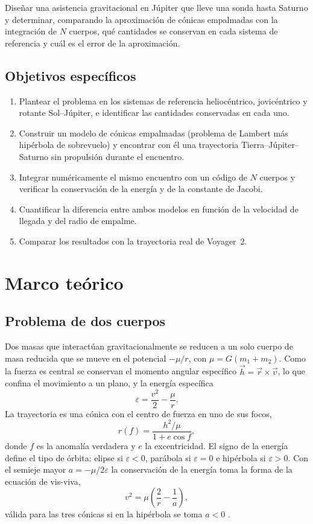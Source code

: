 \documentclass[12pt,letterpaper]{article}
\begin{document}
Diseñar una asistencia gravitacional en Júpiter que lleve una sonda hasta Saturno y
determinar, comparando la aproximación de cónicas empalmadas con la integración de $N$
cuerpos, qué cantidades se conservan en cada sistema de referencia y cuál es el error de la
aproximación.

\subsection*{Objetivos específicos}

\begin{enumerate}
\item Plantear el problema en los sistemas de referencia heliocéntrico, jovicéntrico y
rotante Sol--Júpiter, e identificar las cantidades conservadas en cada uno.
\item Construir un modelo de cónicas empalmadas (problema de Lambert más hipérbola de
sobrevuelo) y encontrar con él una trayectoria Tierra--Júpiter--Saturno sin propulsión
durante el encuentro.
\item Integrar numéricamente el mismo encuentro con un código de $N$ cuerpos y verificar la
conservación de la energía y de la constante de Jacobi.
\item Cuantificar la diferencia entre ambos modelos en función de la velocidad de llegada y
del radio de empalme.
\item Comparar los resultados con la trayectoria real de Voyager~2.
\end{enumerate}

\section{Marco teórico}

\subsection{Problema de dos cuerpos}

Dos masas que interactúan gravitacionalmente se reducen a un solo cuerpo de masa reducida
que se mueve en el potencial $-\mu/r$, con $\mu = G(m_1+m_2)$. Como la fuerza es central se
conservan el momento angular específico $\vec h = \vec r\times\vec v$, lo que confina el
movimiento a un plano, y la energía específica
\begin{equation}
\varepsilon = \frac{v^2}{2} - \frac{\mu}{r}.
\end{equation}
La trayectoria es una cónica con el centro de fuerza en uno de sus focos,
\begin{equation}
r(f) = \frac{h^2/\mu}{1 + e\cos f},
\end{equation}
donde $f$ es la anomalía verdadera y $e$ la excentricidad. El signo de la energía define el
tipo de órbita: elipse si $\varepsilon<0$, parábola si $\varepsilon=0$ e hipérbola si
$\varepsilon>0$. Con el semieje mayor $a = -\mu/2\varepsilon$ la conservación de la energía
toma la forma de la ecuación de vis-viva,
\begin{equation}
v^2 = \mu\left(\frac{2}{r} - \frac{1}{a}\right),
\end{equation}
válida para las tres cónicas si en la hipérbola se toma $a<0$ \cite{curtis2020}.
\end{document}
